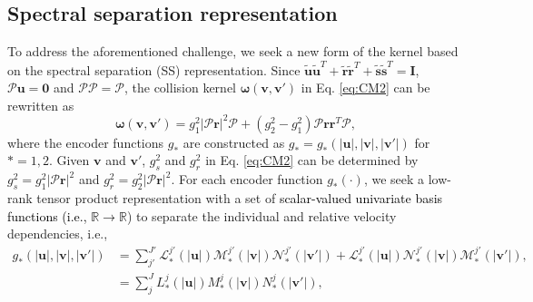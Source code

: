 \documentclass[preprint,1p,times]{elsarticle}
\theoremstyle{definition}
\theoremstyle{remark}
\newcommand{\tcb}[1]{\textcolor{black}{#1}}
\begin{document}
\subsection{Spectral separation representation}
To address the aforementioned challenge, we seek a new form of the kernel based on the spectral separation (SS) representation. Since $\widetilde{\boldsymbol{u}} \widetilde{\boldsymbol{u}}^{T} + \widetilde{\boldsymbol{r}} \widetilde{\boldsymbol{r}}^{T} + \widetilde{\boldsymbol{s}} \widetilde{\boldsymbol{s}}^{T} = \boldsymbol{I}$, $\boldsymbol{\mathcal{P}}\boldsymbol{u}=\boldsymbol{0}$ and $\boldsymbol{\mathcal{P}}\boldsymbol{\mathcal{P}}=\boldsymbol{\mathcal{P}}$, the collision kernel $\boldsymbol{\omega}(\boldsymbol{v}, \boldsymbol{v}')$ in Eq. \eqref{eq:CM2} can be rewritten as
\begin{equation}\label{eq:CM2_sep}
	\boldsymbol{\omega} (\boldsymbol{v}, \boldsymbol{v}') = g_{1}^{2} |\boldsymbol{\mathcal{P}}\boldsymbol{r}|^{2} \boldsymbol{\mathcal{P}} + (g_{2}^{2}-g_{1}^{2}) \boldsymbol{\mathcal{P}} \boldsymbol{r} \boldsymbol{r}^{T} \boldsymbol{\mathcal{P}} ,
\end{equation}
where the encoder functions $g_{\ast}$ are constructed as $g_{\ast}=g_{\ast}(|\boldsymbol{u}|,|\boldsymbol{v}|,|\boldsymbol{v}'|)$ for $\ast = 1, 2$. Given $\boldsymbol{v}$ and $\boldsymbol{v}'$, $g_s^2$ and $g_r^2$ in Eq. \eqref{eq:CM2} can be determined by $g_s^2 = g_1^2 \vert \mathcal{P}\boldsymbol{r}\vert^2$ and $g_r^2 = g_2^2 \vert \mathcal{P}\boldsymbol{r}\vert^2$.
For each encoder function $g_{\ast}(\cdot)$, we seek a low-rank tensor product representation with a set of \tcb{scalar-valued univariate basis functions (i.e., $\mathbb{R}\rightarrow \mathbb{R}$}) to separate the individual and relative velocity dependencies, i.e., 
\begin{equation}\label{eq:sepfun}
    \begin{aligned}
        g_{\ast}(|\boldsymbol{u}|,|\boldsymbol{v}|,|\boldsymbol{v}'|) &= \sum_{j'}^{J'} \mathcal{L}_{\ast}^{j'}(|\boldsymbol{u}|) \mathcal{M}_{\ast}^{j'}(|\boldsymbol{v}|) \mathcal{N}_{\ast}^{j'}(|\boldsymbol{v}'|) + \mathcal{L}_{\ast}^{j'}(|\boldsymbol{u}|) \mathcal{N}_{\ast}^{j'}(|\boldsymbol{v}|) \mathcal{M}_{\ast}^{j'}(|\boldsymbol{v}'|), \\
        &= \sum_{j}^{J} L_{\ast}^{j}(|\boldsymbol{u}|) M_{\ast}^{j}(|\boldsymbol{v}|) N_{\ast}^{j}(|\boldsymbol{v}'|),
    \end{aligned}
\end{equation}
\end{document}
